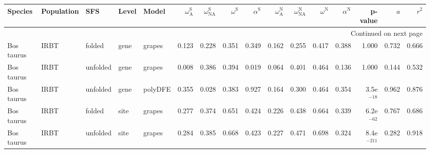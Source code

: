 \begin{longtable}{lllllrrrrrrrrrrr}
\toprule
             Species &                Population &       SFS & Level &    Model & $\omega_{\textrm{A}}^{\textrm{S}}$ & $\omega_{\textrm{NA}}^{\textrm{S}}$ & $\omega^{\textrm{S}}$ & $\alpha^{\textrm{S}}$ & $\omega_{\textrm{A}}^{\textrm{N}}$ & $\omega_{\textrm{NA}}^{\textrm{N}}$ & $\omega^{\textrm{N}}$ & $\alpha^{\textrm{N}}$ &       p-value &    $a$ &  $r^2$ \\
\midrule
\endhead
\midrule
\multicolumn{16}{r}{{Continued on next page}} \\
\midrule
\endfoot

\bottomrule
\endlastfoot
          Bos taurus &                      IRBT &    folded &  gene &   grapes &                              0.123 &                               0.228 &                 0.351 &                 0.349 &                              0.162 &                               0.255 &                 0.417 &                 0.388 &         1.000 &  0.732 &  0.666 \\
          Bos taurus &                      IRBT &  unfolded &  gene &   grapes &                              0.008 &                               0.386 &                 0.394 &                 0.019 &                              0.064 &                               0.401 &                 0.464 &                 0.136 &         1.000 &  0.144 &  0.532 \\
          Bos taurus &                      IRBT &  unfolded &  gene &  polyDFE &                              0.355 &                               0.028 &                 0.383 &                 0.927 &                              0.164 &                               0.300 &                 0.464 &                 0.354 &  3.5e$^{-18}$ &  0.962 &  0.876 \\
          Bos taurus &                      IRBT &    folded &  site &   grapes &                              0.277 &                               0.374 &                 0.651 &                 0.424 &                              0.226 &                               0.438 &                 0.664 &                 0.339 &  6.2e$^{-62}$ &  0.767 &  0.686 \\
          Bos taurus &                      IRBT &  unfolded &  site &   grapes &                              0.284 &                               0.385 &                 0.668 &                 0.423 &                              0.227 &                               0.471 &                 0.698 &                 0.324 & 8.4e$^{-211}$ &  0.282 &  0.918 \\

\end{longtable}
